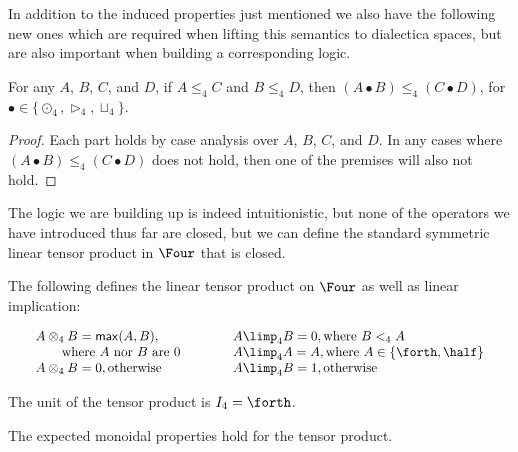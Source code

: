 In addition to the induced properties just mentioned we also have the
following new ones which are required when lifting this semantics to
dialectica spaces, but are also important when building a
corresponding logic.
\begin{lemma}[Functorality]
  \label{lemma:functorality}
  For any $A$, $B$, $C$, and $D$, if $A \leq_4 C$ and $B \le_4 D$,
  then $(A \bullet B) \leq_4 (C \bullet D)$, for $\bullet \in \{\odot_4,
  \rhd_4, \sqcup_4 \}$.
\end{lemma}
\begin{proof}
  Each part holds by case analysis over $A$, $B$, $C$,
  and $D$.  In any cases where $(A \bullet B) \leq_4 (C \bullet D)$
  does not hold, then one of the premises will also not hold.
\end{proof}
The logic we are building up is indeed intuitionistic, but none of the
operators we have introduced thus far are closed, but we can define
the standard symmetric linear tensor product in $\Four$ that is
closed.
\begin{definition}
  \label{def:tensor-and-implication}
  The following defines the linear tensor product on $\Four$ as well
  as linear implication:  
    \begin{center}
      \begin{math}
        \setlength{\arraycolsep}{10px}
        \begin{array}{lll}
          \begin{array}{lll}
            A \otimes_4 B = \mathsf{max}(A,B), \\
          \,\,\,\,\,\,\,\,\,\,\,\,\text{where $A$ nor $B$ are $0$}\\
          A \otimes_4 B = 0, \text{otherwise}
          \end{array}
          &
          \begin{array}{lll}
          A \limp_4 B = 0, \text{where $B <_4 A$}\\
          A \limp_4 A = A, \text{where $A \in \{\forth,\half\}$}\\
          A \limp_4 B = 1, \text{otherwise}
        \end{array}
        \end{array}
      \end{math}
    \end{center}
    The unit of the tensor product is $I_4 = \forth$.\\   
\end{definition}
The expected monoidal properties hold for the tensor product.
